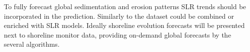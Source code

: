 \documentclass[format=sigconf, review=false, screen=true]{acmart}
\begin{document}
To fully forecast global sedimentation and erosion patterns SLR trends should be incorporated in the prediction. Similarly to \citet{vousdoukas2020sandy} the dataset could be combined or enriched with SLR models. Ideally shoreline evolution forecasts will be presented next to shoreline monitor data, providing on-demand global forecasts by the several algorithms.    




%
%
%
\end{document}
